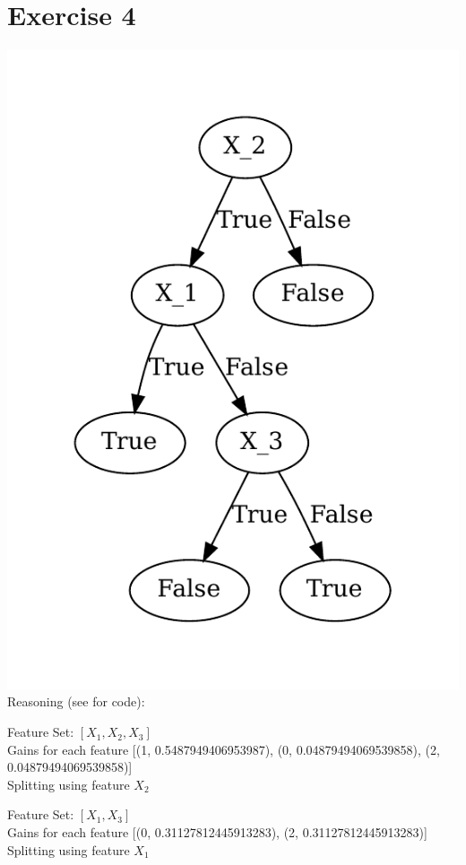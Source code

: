 \documentclass[12pt]{article}
\begin{document}
\section*{Exercise 4}
\includegraphics{code/Decision-Tree.gv.pdf} \\
Reasoning (see  for code):
\bigskip

Feature Set: $[X_1, X_2, X_3]$ \\
Gains for each feature [(1, 0.5487949406953987), (0, 0.04879494069539858), (2, 0.04879494069539858)] \\
Splitting using feature $X_2$
\bigskip

Feature Set: $[X_1, X_3]$ \\
Gains for each feature [(0, 0.31127812445913283), (2, 0.31127812445913283)] \\
Splitting using feature $X_1$
\bigskip
\end{document}
